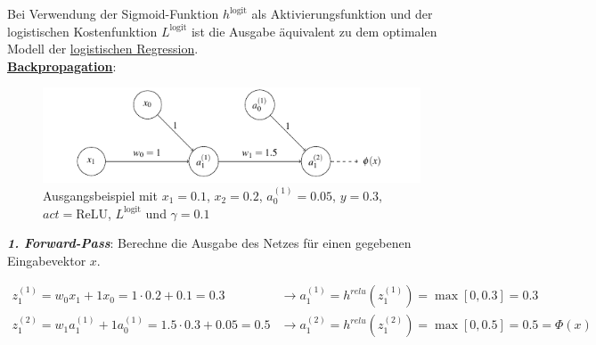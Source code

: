 Bei Verwendung der Sigmoid-Funktion $h^{\text{logit}}$ als Aktivierungsfunktion und der logistischen Kostenfunktion $L^{\text{logit}}$ ist die Ausgabe äquivalent zu dem optimalen Modell der \underline{logistischen Regression}.\\

\underline{\textbf{Backpropagation}}:\\
\begin{figure}[H]
    \centering
    \includegraphics[width=1\textwidth]{deepLearning/EinfachesANN.png}
    \caption{Ausgangsbeispiel mit $x_1=0.1$, $x_2=0.2$, $a_0^{(1)}=0.05$, $y=0.3$, $act=\text{ReLU}$, $L^{\text{logit}}$ und $\gamma=0.1$}
\end{figure}

\emph{\textbf{1. Forward-Pass}}: Berechne die Ausgabe des Netzes für einen gegebenen Eingabevektor $x$.

\begin{equation*}
    \begin{aligned}
        z_1^{(1)} = w_0x_1+1x_0=1\cdot0.2+0.1=0.3 &\longrightarrow a_1^{(1)}=h^{relu}(z_1^{(1)}) = \max \left[ 0, 0.3\right] = 0.3\\
        z_1^{(2)} = w_1a_1^{(1)}+1a_0^{(1)}=1.5\cdot0.3+0.05=0.5 &\longrightarrow a_1^{(2)}=h^{relu}(z_1^{(2)}) = \max \left[ 0, 0.5\right] = 0.5 = \Phi(x)\\
    \end{aligned}
\end{equation*}
